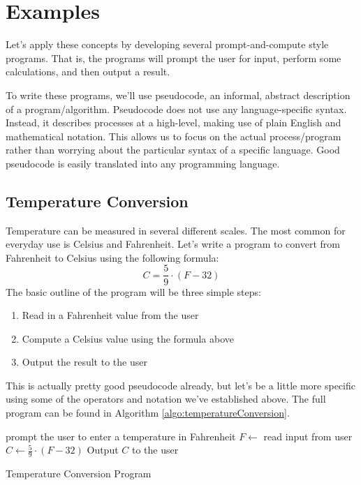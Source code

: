 \section{Examples}

Let's apply these concepts by developing several prompt-and-compute style
programs.  That is, the programs will prompt the user for input, perform some
calculations, and then output a result.  

To write these programs, we'll use pseudocode, an informal, abstract 
description of a program/algorithm.  Pseudocode  
does not use any 
language-specific syntax.  Instead, it describes processes at a high-level, 
making use of plain English and mathematical notation.  This allows us 
to focus on the actual process/program
rather than worrying about the particular syntax of a specific language.  
Good pseudocode is easily translated into any programming language.


\subsection{Temperature Conversion}

Temperature can be measured in several different scales.  The most common 
for everyday use is Celsius and Fahrenheit.  Let's write a program to convert
from Fahrenheit to Celsius using the following formula:
  $$C = \frac{5}{9} \cdot (F-32)$$
The basic outline of the program will be three simple steps:
\begin{enumerate}
  \item Read in a Fahrenheit value from the user
  \item Compute a Celsius value using the formula above
  \item Output the result to the user
\end{enumerate}
This is actually pretty good pseudocode already, but let's be a little
more specific using some of the operators and notation we've established
above.  The full program can be found in Algorithm \ref{algo:temperatureConversion}.

\begin{algorithm}
prompt the user to enter a temperature in Fahrenheit \;
$F \leftarrow $ read input from user \;
$C \leftarrow \frac{5}{9} \cdot (F-32)$ \;
Output $C$ to the user \;
\caption{Temperature Conversion Program}
\label{algo:temperatureConversion}
\end{algorithm}

